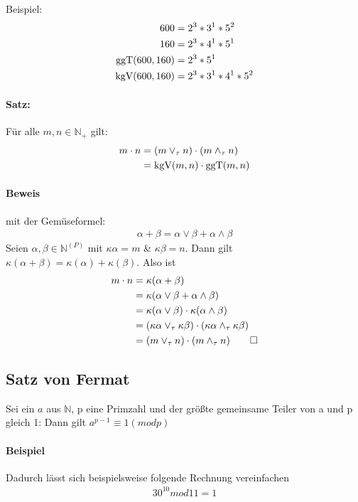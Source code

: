 Beispiel:
\begin{align*}
  600 &= 2^3 * 3^1 * 5^2\\
  160 &= 2^3 * 4^1 * 5^1\\
  \text{ggT}(600, 160) &= 2^3 * 5^1\\
  \text{kgV}(600, 160) &= 2^3 * 3^1 * 4^1 * 5^2\\
\end{align*}

\paragraph{Satz:} Für alle $m, n \in \mathbb N_+$ gilt:
\begin{align*}
m \cdot n &= (m \lor_{\tau} n) \cdot (m \land_{\tau} n)\\
&= \text{kgV}(m,n) \cdot \text{ggT}(m,n)
\end{align*}

\paragraph{Beweis} mit der \glqq Gemüseformel\grqq:
\begin{align*}
\alpha + \beta = \alpha \lor \beta + \alpha \land \beta
\end{align*}
Seien $\alpha, \beta \in \mathbb N^{(P)}$ mit $\kappa \alpha = m$ \& $\kappa
\beta = n$. Dann gilt $\kappa(\alpha + \beta) = \kappa(\alpha) + \kappa(\beta)$.
Also ist
\begin{align*}
m \cdot n &= \kappa(\alpha + \beta)\\
 &= \kappa(\alpha \lor \beta + \alpha \land
\beta)\\
&= \kappa(\alpha \lor \beta) \cdot \kappa(\alpha \land \beta)\\
&= (\kappa \alpha \lor_{\tau} \kappa \beta) \cdot (\kappa \alpha \land_{\tau}
\kappa \beta)\\
&= (m \lor_{\tau} n) \cdot (m \land_{\tau} n) \qed
\end{align*}

\subsection{Satz von Fermat}
Sei ein $a$ aus ${\mathbb N}$, p eine Primzahl und der größte
gemeinsame Teiler von a und p gleich 1:
Dann gilt $a^{p-1} \equiv 1 (mod p)$

\paragraph{Beispiel}
Dadurch lässt sich beispielsweise folgende Rechnung vereinfachen
\begin{align*}
  30^{10} mod 11 = 1
\end{align*}


